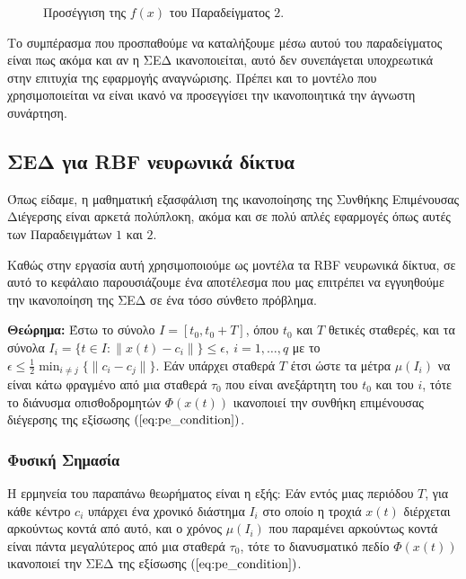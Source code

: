 \begin{figure}[h!]
\centering
\scalebox{.6}{}
\caption{ Προσέγγιση της $f(x)$ του Παραδείγματος $2$. }
\label{fig:sines_approximation}
\end{figure}

\pagebreak
Το συμπέρασμα που προσπαθούμε να καταλήξουμε μέσω αυτού του παραδείγματος είναι πως ακόμα και αν η ΣΕΔ ικανοποιείται, αυτό δεν συνεπάγεται υποχρεωτικά στην επιτυχία της εφαρμογής αναγνώρισης. Πρέπει και το μοντέλο που χρησιμοποιείται να είναι ικανό να προσεγγίσει την ικανοποιητικά την άγνωστη συνάρτηση.

\subsection{ΣΕΔ για RBF νευρωνικά δίκτυα} \label{subsec:rbf_PE}
Όπως είδαμε, η μαθηματική εξασφάλιση της ικανοποίησης της Συνθήκης Επιμένουσας Διέγερσης είναι αρκετά πολύπλοκη, ακόμα και σε πολύ απλές εφαρμογές όπως αυτές των Παραδειγμάτων $1$ και $2$. 

Καθώς στην εργασία αυτή χρησιμοποιούμε ως μοντέλα τα RBF νευρωνικά δίκτυα, σε αυτό το κεφάλαιο παρουσιάζουμε ένα αποτέλεσμα που μας επιτρέπει να εγγυηθούμε την ικανοποίηση της ΣΕΔ σε ένα τόσο σύνθετο πρόβλημα.

\textbf{Θεώρημα:} 
Έστω το σύνολο $I = [t_0, t_0 + T]$, όπου $t_0$ και $T$
θετικές σταθερές, και τα σύνολα $I_i = \{ t \in I :  \| x(t) - c_i \| \} \leq \epsilon, \: i = 1,\dots, q $ με το $\epsilon \leq \frac{1}{2} \min_{i \neq j} \{\| c_i - c_j \| \}$. Εάν υπάρχει σταθερά $T$ έτσι ώστε τα μέτρα $\mu(I_i)$ να είναι κάτω φραγμένο από μια σταθερά $\tau_0$ που είναι ανεξάρτητη του $t_0$ και του $i$, τότε το διάνυσμα οπισθοδρομητών $\varPhi(x(t))$ ικανοποιεί την συνθήκη επιμένουσας διέγερσης της εξίσωσης $(\ref{eq:pe_condition})$.

\subsubsection{Φυσική Σημασία}
Η ερμηνεία του παραπάνω θεωρήματος είναι η εξής: Εάν εντός μιας περιόδου $T$, για κάθε κέντρο $c_i$ υπάρχει ένα χρονικό διάστημα $I_i$ στο οποίο η τροχιά $x(t)$ διέρχεται αρκούντως κοντά από αυτό, και ο χρόνος $\mu (I_i)$ που παραμένει αρκούντως κοντά είναι πάντα μεγαλύτερος από μια σταθερά $\tau_0$, τότε το διανυσματικό πεδίο $\varPhi(x(t))$ ικανοποιεί την ΣΕΔ της εξίσωσης $(\ref{eq:pe_condition})$.

